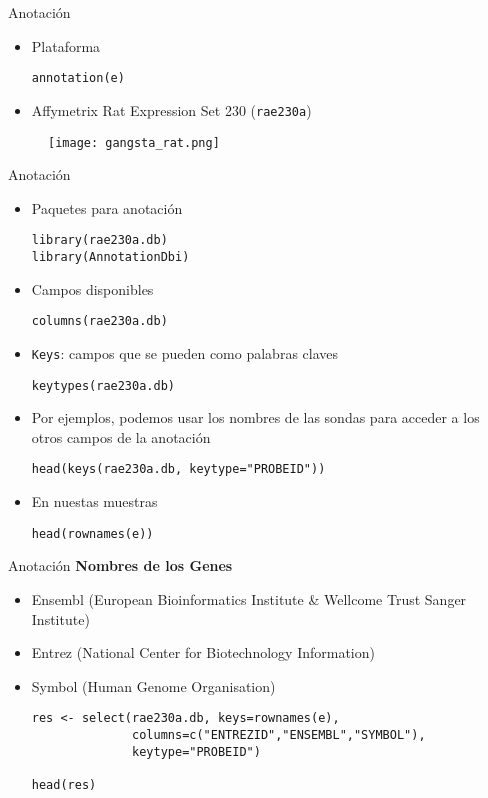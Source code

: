 \documentclass{beamer}
\begin{document}
\begin{frame}[fragile]{Anotación}
\begin{itemize}
\item Plataforma
\begin{verbatim}
annotation(e)
\end{verbatim}
\item Affymetrix Rat Expression Set 230 (\texttt{rae230a})
\end{itemize}
\begin{figure}[H]
\centering
\texttt{[image: gangsta\_rat.png]}
\end{figure}
\end{frame}

\begin{frame}[fragile]{Anotación}
\begin{itemize}
\item Paquetes para anotación
\begin{verbatim}
library(rae230a.db)
library(AnnotationDbi)
\end{verbatim}
\item Campos disponibles
\begin{verbatim}
columns(rae230a.db)
\end{verbatim}
\item \verb=Keys=: campos que se pueden como palabras claves 
\begin{verbatim}
keytypes(rae230a.db)
\end{verbatim}
\item Por ejemplos, podemos usar los nombres de las sondas para acceder a los otros campos de la anotación
\begin{verbatim}
head(keys(rae230a.db, keytype="PROBEID"))
\end{verbatim}
\item En nuestas muestras
\begin{verbatim}
head(rownames(e))
\end{verbatim}
\end{itemize}
\end{frame}

\begin{frame}[fragile]{Anotación}
\textbf{Nombres de los Genes}
\begin{itemize}
\item Ensembl (European Bioinformatics Institute \& Wellcome Trust Sanger Institute)
\item Entrez (National Center for Biotechnology Information)
\item Symbol (Human Genome Organisation)
\begin{verbatim}
res <- select(rae230a.db, keys=rownames(e),
              columns=c("ENTREZID","ENSEMBL","SYMBOL"), 
              keytype="PROBEID")
			  
head(res)
\end{verbatim}
\end{itemize}
\end{frame}
\end{document}
